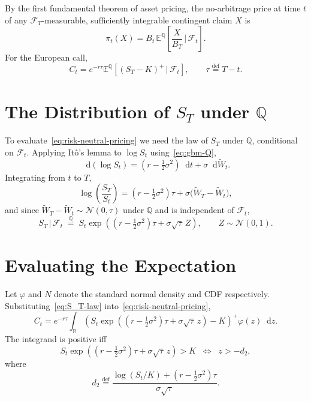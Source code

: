 \documentclass[11pt,a4paper]{article}
\theoremstyle{plain}
\theoremstyle{definition}
\theoremstyle{remark}
\newcommand{\R}{\mathbb{R}}
\newcommand{\E}{\mathbb{E}}
\newcommand{\F}{\mathcal{F}}
\newcommand{\Q}{\mathbb{Q}}
\newcommand{\dd}{\mathop{}\!\mathrm{d}}
\newcommand{\eqdef}{\overset{\mathrm{def}}{=}}
\begin{document}
By the first fundamental theorem of asset pricing, the no-arbitrage
price at time \(t\) of any \(\F_T\)-measurable, sufficiently integrable
contingent claim \(X\) is
\[
    \pi_t(X)
    = B_t \, \E^{\Q}\!\left[\frac{X}{B_T} \,\Big|\, \F_t\right].
\]
For the European call,
\begin{equation}
    C_t
    = e^{-r\tau}
      \E^{\Q}\!\left[(S_T - K)^+ \,\big|\, \F_t\right],
    \qquad \tau \eqdef T - t.
    \label{eq:risk-neutral-pricing}
\end{equation}

\section{The Distribution of \(S_T\) under \(\Q\)}

To evaluate~\eqref{eq:risk-neutral-pricing} we need the law of \(S_T\)
under \(\Q\), conditional on \(\F_t\). Applying It\^{o}'s lemma to
\(\log S_t\) using~\eqref{eq:gbm-Q},
\[
    \dd(\log S_t)
    = \left(r - \tfrac{1}{2}\sigma^2\right)\dd t
      + \sigma \dd \widetilde{W}_t.
\]
Integrating from \(t\) to \(T\),
\[
    \log\!\left(\frac{S_T}{S_t}\right)
    = \left(r - \tfrac{1}{2}\sigma^2\right)\tau
      + \sigma\bigl(\widetilde{W}_T - \widetilde{W}_t\bigr),
\]
and since \(\widetilde{W}_T - \widetilde{W}_t \sim \mathcal{N}(0, \tau)\)
under \(\Q\) and is independent of \(\F_t\),
\begin{equation}
    S_T \,\big|\, \F_t
    \;\overset{\Q}{=}\;
    S_t \exp\!\left(
        \left(r - \tfrac{1}{2}\sigma^2\right)\tau
        + \sigma\sqrt{\tau}\, Z
    \right),
    \qquad Z \sim \mathcal{N}(0,1).
    \label{eq:S_T-law}
\end{equation}

\section{Evaluating the Expectation}

Let \(\varphi\) and \(N\) denote the standard normal density and CDF
respectively. Substituting~\eqref{eq:S_T-law}
into~\eqref{eq:risk-neutral-pricing},
\[
    C_t
    = e^{-r\tau}
      \int_{\R}\!\left(
          S_t \exp\!\left(
              (r - \tfrac{1}{2}\sigma^2)\tau + \sigma\sqrt{\tau}\, z
          \right) - K
      \right)^+ \!\!\varphi(z) \dd z.
\]
The integrand is positive iff
\[
    S_t \exp\!\left(
        (r - \tfrac{1}{2}\sigma^2)\tau + \sigma\sqrt{\tau}\, z
    \right) > K
    \;\;\Longleftrightarrow\;\;
    z > -d_2,
\]
where
\begin{equation}
    d_2 \eqdef
    \frac{\log(S_t / K) + (r - \tfrac{1}{2}\sigma^2)\tau}
         {\sigma \sqrt{\tau}}.
    \label{eq:d2}
\end{equation}
\end{document}
